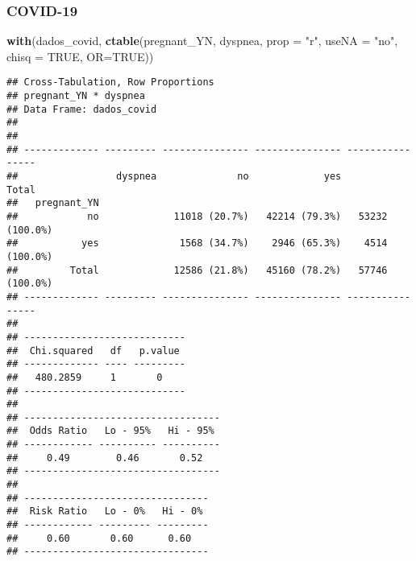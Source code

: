\documentclass[
]{article}
\newenvironment{Shaded}{\begin{snugshade}}{\end{snugshade}}
\newcommand{\DataTypeTok}[1]{\textcolor[rgb]{0.13,0.29,0.53}{#1}}
\newcommand{\DecValTok}[1]{\textcolor[rgb]{0.00,0.00,0.81}{#1}}
\newcommand{\KeywordTok}[1]{\textcolor[rgb]{0.13,0.29,0.53}{\textbf{#1}}}
\newcommand{\NormalTok}[1]{#1}
\newcommand{\OperatorTok}[1]{\textcolor[rgb]{0.81,0.36,0.00}{\textbf{#1}}}
\newcommand{\OtherTok}[1]{\textcolor[rgb]{0.56,0.35,0.01}{#1}}
\newcommand{\StringTok}[1]{\textcolor[rgb]{0.31,0.60,0.02}{#1}}
\begin{document}
\hypertarget{covid-19-13}{%
\subsubsection{COVID-19}\label{covid-19-13}}

\begin{Shaded}
\end{Shaded}

\begin{Shaded}
\begin{Highlighting}[]
\KeywordTok{with}\NormalTok{(dados_covid, }\KeywordTok{ctable}\NormalTok{(pregnant_YN, dyspnea, }\DataTypeTok{prop =} \StringTok{"r"}\NormalTok{, }\DataTypeTok{useNA =} \StringTok{"no"}\NormalTok{, }\DataTypeTok{chisq =} \OtherTok{TRUE}\NormalTok{, }\DataTypeTok{OR=}\OtherTok{TRUE}\NormalTok{))}
\end{Highlighting}
\end{Shaded}

\begin{verbatim}
## Cross-Tabulation, Row Proportions  
## pregnant_YN * dyspnea  
## Data Frame: dados_covid  
## 
## 
## ------------- --------- --------------- --------------- ----------------
##                 dyspnea              no             yes            Total
##   pregnant_YN                                                           
##            no             11018 (20.7%)   42214 (79.3%)   53232 (100.0%)
##           yes              1568 (34.7%)    2946 (65.3%)    4514 (100.0%)
##         Total             12586 (21.8%)   45160 (78.2%)   57746 (100.0%)
## ------------- --------- --------------- --------------- ----------------
## 
## ----------------------------
##  Chi.squared   df   p.value 
## ------------- ---- ---------
##   480.2859     1       0    
## ----------------------------
## 
## ----------------------------------
##  Odds Ratio   Lo - 95%   Hi - 95% 
## ------------ ---------- ----------
##     0.49        0.46       0.52   
## ----------------------------------
## 
## --------------------------------
##  Risk Ratio   Lo - 0%   Hi - 0% 
## ------------ --------- ---------
##     0.60       0.60      0.60   
## --------------------------------
\end{verbatim}
\end{document}
